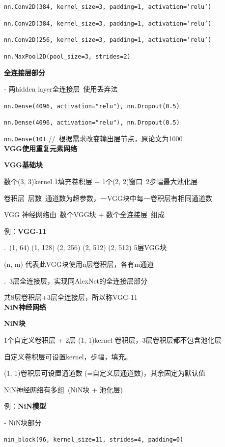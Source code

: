 \documentclass[UTF8]{ctexart}
\begin{document}
  \quad \texttt{nn.Conv2D(384, kernel\_size=3, padding=1, activation='relu')}
  
  \quad \texttt{nn.Conv2D(384, kernel\_size=3, padding=1, activation='relu')} 
  
  \quad \texttt{nn.Conv2D(256, kernel\_size=3, padding=1, activation='relu')}
  
  \quad \texttt{nn.MaxPool2D(pool\_size=3, strides=2)}

  \textbf{全连接层部分}
  
  \quad - 两hidden layer全连接层\ 使用丢弃法

  \quad \texttt{nn.Dense(4096, activation="relu"), nn.Dropout(0.5)}
  
  \quad \texttt{nn.Dense(4096, activation="relu"), nn.Dropout(0.5)}
  
  \quad \texttt{nn.Dense(10)} //\ 根据需求改变输出层节点，原论文为1000\\
\textbf{VGG使用重复元素网络}

  \textbf{VGG基础块}

  \quad 数个(3, 3)kernel 1填充卷积层 + 1个(2, 2)窗口\ 2步幅最大池化层

  \quad 卷积层\ 层数\ 通道数为超参数，一VGG块中每一卷积层有相同通道数

  VGG 神经网络由\ 数个VGG块 + 数个全连接层\ 组成

  例：\textbf{VGG-11}
  
  .\ (1, 64) (1, 128) (2, 256) (2, 512) (2, 512) 5层VGG块

  \quad \quad (n, m) 代表此VGG块使用n层卷积层，各有m通道
  
  .\ 3层全连接层，实现同AlexNet的全连接层部分
  
  \quad 共8层卷积层+3层全连接层，所以称VGG-11\\
\textbf{NiN神经网络}

  \textbf{NiN块}

  \quad 1个自定义卷积层 + 2层 (1, 1)kernel 卷积层，3层卷积层都不包含池化层

  \quad 自定义卷积层可设置kernel，步幅，填充。
  
  \quad (1, 1)卷积层可设置通道数 (=自定义层通道数)，其余固定为默认值

  NiN神经网络有多组\ (NiN块 + 池化层)
  
  例：\textbf{NiN模型}

  \quad - NiN块部分

  \quad \texttt{nin\_block(96, kernel\_size=11, strides=4, padding=0)}
\end{document}
